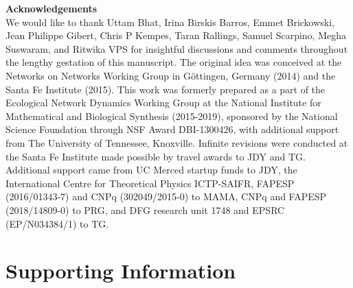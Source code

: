 \documentclass[9pt,twocolumn,twoside]{pnas-new}
\begin{document}
\vspace{0mm}
\noindent \textbf{Acknowledgements}\\
  \footnotesize{
  We would like to thank
  Uttam Bhat,
  Irina Birskis Barros,
  Emmet Brickowski,
  Jean Philippe Gibert,
  Chris P Kempes,
  Taran Rallings,
  Samuel Scarpino,
  Megha Suswaram,
  and Ritwika VPS 
  for insightful discussions and comments throughout the lengthy gestation of this manuscript.
  The original idea was conceived at the Networks on Networks Working Group in G\"ottingen, Germany (2014) and the Santa Fe Institute (2015).
  This work was formerly prepared as a part of the Ecological Network Dynamics Working Group at the National Institute for Mathematical and Biological Synthesis (2015-2019), sponsored by the National Science Foundation through NSF Award DBI-1300426, with additional support from The University of Tennessee, Knoxville.
  Infinite revisions were conducted at the Santa Fe Institute made possible by travel awards to JDY and TG.
  Additional support came from UC Merced startup funds to JDY, the International Centre for Theoretical Physics ICTP-SAIFR, FAPESP (2016/01343-7) and CNPq (302049/2015-0) to MAMA, CNPq and FAPESP (2018/14809-0) to PRG, and DFG research unit 1748 and EPSRC (EP/N034384/1) to TG.
  }
\clearpage

\section*{Supporting Information}

\setcounter{figure}{0}
\renewcommand{\thefigure}{S\arabic{figure}}

\setcounter{equation}{0}
\renewcommand{\theequation}{S\arabic{equation}}
\end{document}
